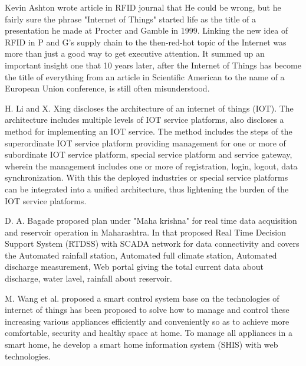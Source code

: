 \documentclass[a4paper,12pt]{report}
\begin{document}
Kevin Ashton wrote article in RFID journal that He could be wrong, but he fairly sure the phrase 
"Internet of Things" started life as the title of a presentation he made at Procter and Gamble in 1999. Linking the 
new idea of RFID in P and G's supply chain to the then-red-hot topic of the Internet was more than just a good way to get executive attention. 
It summed up an important insight one that 10 years later, after the Internet of Things has become the title of everything from 
an article in Scientific American to the name of a European Union conference, is still often misunderstood.
\cite{rfid:iot}
\newline

H. Li and X. Xing discloses the architecture of an internet of things (IOT). The architecture includes multiple levels of IOT service platforms,
also discloses a method for implementing an IOT service. The method includes the steps of the superordinate IOT service platform providing 
management for one or more of subordinate IOT service platform, special service platform and service gateway, wherein the management includes 
one or more of registration, login, logout, data synchronization. With this the deployed industries or special service 
platforms can be integrated into a unified architecture, thus lightening the burden of the IOT service platforms.
\cite{P-IoT:EP2566281A1}
\newline

D. A. Bagade  proposed plan under "Maha krishna" for real time data acquisition and reservoir operation in Maharashtra. In that proposed Real Time Decision Support 
System (RTDSS) with SCADA network for data connectivity and covers the  Automated rainfall station, Automated full climate station, Automated discharge measurement,
Web portal giving the total current data about discharge, water lavel, rainfall about reservoir.
\cite{RTDSS:BAGADE}
\newline

M. Wang et al. proposed a smart control system base on the technologies of internet of things has been proposed to solve
how to manage and control these increasing various appliances efficiently and conveniently so as to achieve more comfortable, 
security and healthy space at home. To manage all appliances in a smart home, he develop a smart home information system (SHIS) with web technologies.
\cite{IoT:home-automation}
\newline
\end{document}
